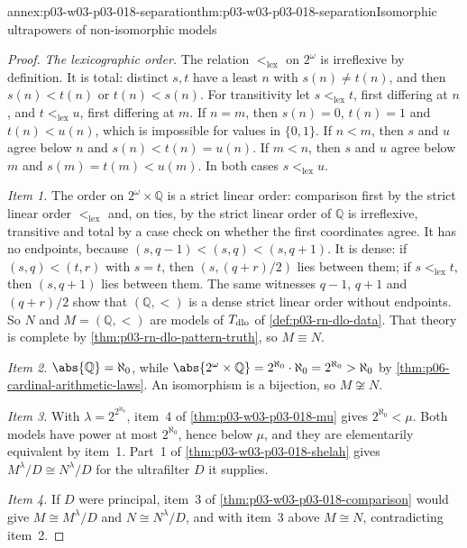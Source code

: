 \begin{annexitem}{annex:p03-w03-p03-018-separation}{thm:p03-w03-p03-018-separation}{Isomorphic ultrapowers of non-isomorphic models}
\begin{proof}
\emph{The lexicographic order.}  The relation \(<_{\mathrm{lex}}\) on
\(2^\omega\) is irreflexive by definition.  It is total: distinct \(s,t\)
have a least \(n\) with \(s(n)\ne t(n)\), and then \(s(n)<t(n)\) or
\(t(n)<s(n)\).  For transitivity let \(s<_{\mathrm{lex}}t\), first differing
at \(n\), and \(t<_{\mathrm{lex}}u\), first differing at \(m\).  If \(n=m\),
then \(s(n)=0\), \(t(n)=1\) and \(t(n)<u(n)\), which is impossible for
values in \(\{0,1\}\).  If \(n<m\), then \(s\) and \(u\) agree below \(n\) and
\(s(n)<t(n)=u(n)\).  If \(m<n\), then \(s\) and \(u\) agree below \(m\) and
\(s(m)=t(m)<u(m)\).  In both cases \(s<_{\mathrm{lex}}u\).

\emph{Item 1.}  The order on \(2^\omega\times\mathbb Q\) is a strict linear
order: comparison first by the strict linear order \(<_{\mathrm{lex}}\) and,
on ties, by the strict linear order of \(\mathbb Q\) is irreflexive,
transitive and total by a case check on whether the first coordinates agree.
It has no endpoints, because \((s,q-1)<(s,q)<(s,q+1)\).  It is dense: if
\((s,q)<(t,r)\) with \(s=t\), then \((s,(q+r)/2)\) lies between them; if
\(s<_{\mathrm{lex}}t\), then \((s,q+1)\) lies between them.  The same
witnesses \(q-1\), \(q+1\) and \((q+r)/2\) show that \((\mathbb Q,<)\) is a
dense strict linear order without endpoints.  So \(N\) and
\(M=(\mathbb Q,<)\) are models of \(T_{\rm dlo}\) of
\cref{def:p03-rn-dlo-data}.  That theory is complete by
\cref{thm:p03-rn-dlo-pattern-truth}, so \(M\equiv N\).

\emph{Item 2.}  \(\abs{\mathbb Q}=\aleph_0\), while
\(\abs{2^\omega\times\mathbb Q}=2^{\aleph_0}\cdot\aleph_0=2^{\aleph_0}>\aleph_0\)
by \cref{thm:p06-cardinal-arithmetic-laws}.  An isomorphism is a bijection,
so \(M\not\cong N\).

\emph{Item 3.}  With \(\lambda=2^{2^{\aleph_0}}\), item~4 of
\cref{thm:p03-w03-p03-018-mu} gives \(2^{\aleph_0}<\mu\).  Both models have
power at most \(2^{\aleph_0}\), hence below \(\mu\), and they are
elementarily equivalent by item~1.  Part~1 of
\cref{thm:p03-w03-p03-018-shelah} gives \(M^\lambda/D\cong N^\lambda/D\) for
the ultrafilter \(D\) it supplies.

\emph{Item 4.}  If \(D\) were principal, item~3 of
\cref{thm:p03-w03-p03-018-comparison} would give
\(M\cong M^\lambda/D\) and \(N\cong N^\lambda/D\), and with item~3 above
\(M\cong N\), contradicting item~2.


\end{proof}
\end{annexitem}
